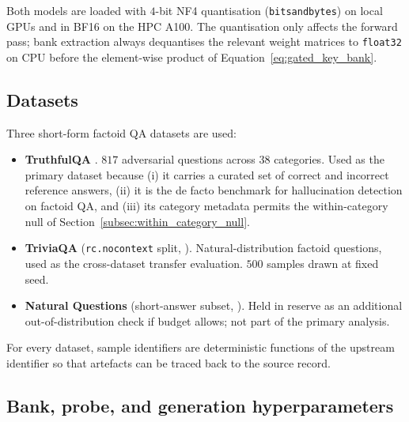 Both models are loaded with $4$-bit NF4 quantisation
(\texttt{bitsandbytes}) on local GPUs and in BF16 on the HPC A100. The
quantisation only affects the forward pass; bank extraction always
dequantises the relevant weight matrices to \texttt{float32} on CPU
before the element-wise product of
Equation~\eqref{eq:gated_key_bank}.

\subsection{Datasets}
\label{subsec:datasets}

Three short-form factoid QA datasets are used:

\begin{itemize}[leftmargin=*]
    \item \textbf{TruthfulQA} \citep{lin2022truthfulqa}. $817$ adversarial
          questions across $38$ categories. Used as the primary dataset
          because (i) it carries a curated set of correct and incorrect
          reference answers, (ii) it is the de facto benchmark for
          hallucination detection on factoid QA, and (iii) its
          category metadata permits the within-category null of
          Section~\ref{subsec:within_category_null}.
    \item \textbf{TriviaQA} (\texttt{rc.nocontext} split,
          \citealt{joshi2017triviaqa}). Natural-distribution factoid
          questions, used as the cross-dataset transfer evaluation.
          $500$ samples drawn at fixed seed.
    \item \textbf{Natural Questions} (short-answer subset,
          \citealt{kwiatkowski2019natural}). Held in reserve as an
          additional out-of-distribution check if budget allows; not part
          of the primary analysis.
\end{itemize}

For every dataset, sample identifiers are deterministic functions of the
upstream identifier so that artefacts can be traced back to the source
record.

\subsection{Bank, probe, and generation hyperparameters}
\label{subsec:hyperparameters}

